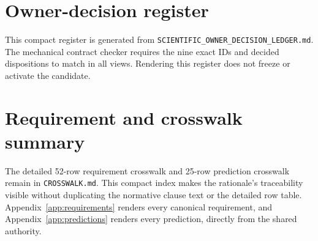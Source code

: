 \documentclass[10pt]{article}
\newcommand{\code}[1]{\nolinkurl{#1}}
\begin{document}
\appendix
\clearpage
\section{Owner-decision register}\label{app:owner-decisions}

This compact register is generated from
\code{SCIENTIFIC_OWNER_DECISION_LEDGER.md}. The mechanical contract checker
requires the nine exact IDs and decided dispositions to match in all views.
Rendering this register does not freeze or activate the candidate.



\clearpage
\section{Requirement and crosswalk summary}\label{app:traceability-summary}

The detailed 52-row requirement crosswalk and 25-row prediction crosswalk
remain in \code{CROSSWALK.md}. This compact index makes the rationale's
traceability visible without duplicating the normative clause text or the
detailed row table. Appendix~\ref{app:requirements} renders every canonical
requirement, and Appendix~\ref{app:predictions} renders every prediction,
directly from the shared authority.
\end{document}
